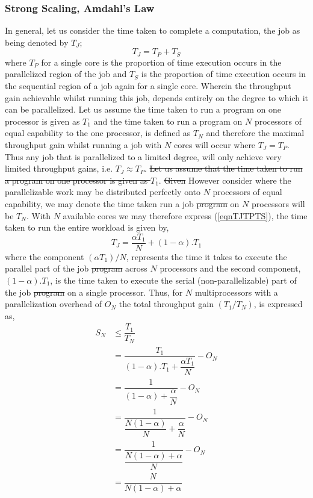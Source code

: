 \documentclass[10pt]{article}[draft]
\begin{document}
\subsubsection{Strong Scaling, Amdahl's Law}
In general, let us consider the time taken to complete a computation, the {job} as being denoted by $T_J$;
\begin{equation}
T_J = T_P + T_S
\label{eqnTJTPTS}
\end{equation}
where $T_P$ for a single core is the proportion of time execution occurs in the parallelized region of the job and $T_S$ is the proportion of time execution occurs in the sequential region of a job again for a single core. Wherein the throughput gain achievable whilst running this job, depends entirely on the degree to which it can be parallelized. Let us assume the time taken to run a program on one processor is given as $T_1$ and the time taken to run a program on $N$ processors of equal capability to the one processor, is defined as $T_N$ and therefore the maximal throughput gain whilst running a job with $N$ cores  will occur  where $T_J = T_P$. Thus any job that is parallelized to a limited degree, will only achieve very limited throughput gains, i.e. $T_J \approx T_P$. \st{Let us assume that the time taken to run a program on one processor is given as $T_1$}. \st{Given} However consider where the  parallelizable work may be distributed perfectly onto $N$ processors of equal capability, we may denote the time taken run a job \st{program} on $N$ processors will be $T_N$.  With $N$ available cores we may therefore express (\ref{eqnTJTPTS}), the time taken to run the entire workload is given by,
\begin{equation}
	T_J = \dfrac{\alpha T_1}{ N} + (1 - \alpha) . T_1 
\end{equation}
where the component $(\alpha T_1 )/ N$, represents the time it takes to execute the parallel part of the job \st{program} across $N$ processors and  the second component, $(1 - \alpha). T_1$, is the time  taken to execute the serial (non-parallelizable) part of the job \st{program} on a single processor.  Thus, for  $N$ multiprocessors with a parallelization overhead of $O_N$ the total throughput gain $(	T_1 / T_N)$, is expressed as,
\begin{equation}
	\begin{split}
 S_N	& \leq 	\dfrac{T_1}{T_N} \\
	& = \dfrac{T_1}{(1 - \alpha) . T_1 + \dfrac{\alpha T_1}{ N}}- O_N \\
		& = \dfrac{1}{(1 - \alpha) + \dfrac{\alpha}{ N}} - O_N \\
		& = \dfrac{1}{\dfrac{N(1 - \alpha)}{N} + \dfrac{\alpha}{ N}} - O_N \\
		& = \dfrac{1}{\dfrac{N(1 - \alpha) + \alpha}{ N}} - O_N \\
	 & = \dfrac{N}{{N(1 - \alpha) + \alpha}}
	\end{split}
\label{Amdahl2}
\end{equation}
\end{document}
